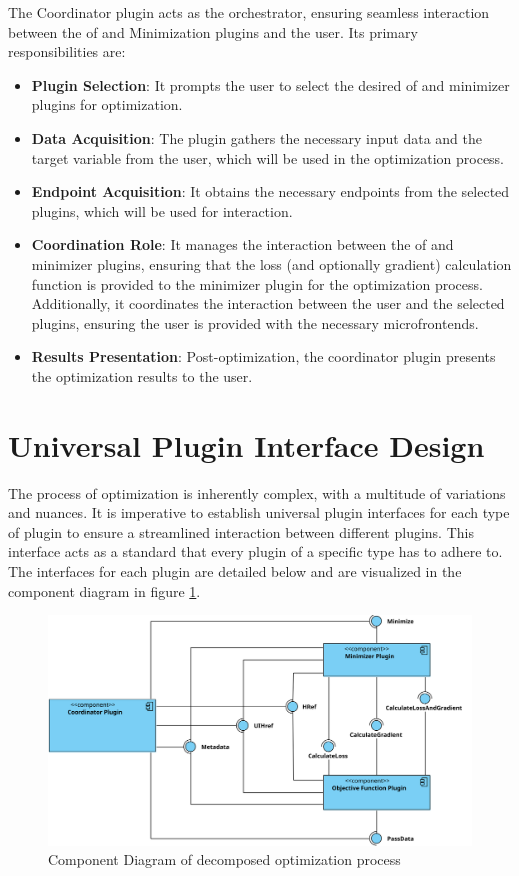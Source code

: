 \documentclass[
  a4paper,  %
  twoside,  %
  bibliography=totoc,
  headsepline,
  cleardoublepage=empty,
  parskip=half,
  draft=false
]{scrbook}
\begin{document}
The Coordinator plugin acts as the orchestrator, ensuring seamless interaction between the \gls{of} and Minimization plugins and the user.
Its primary responsibilities are:

\begin{itemize}
\item \textbf{Plugin Selection}: It prompts the user to select the desired \gls{of} and minimizer plugins for optimization.
\item \textbf{Data Acquisition}: The plugin gathers the necessary input data and the target variable from the user, which will be used in the optimization process.
\item \textbf{Endpoint Acquisition}: It obtains the necessary endpoints from the selected plugins, which will be used for interaction.
\item \textbf{Coordination Role}: It manages the interaction between the \gls{of} and minimizer plugins, ensuring that the loss (and optionally gradient) calculation function is provided to the minimizer plugin for the optimization process.
Additionally, it coordinates the interaction between the user and the selected plugins, ensuring the user is provided with the necessary microfrontends.
\item \textbf{Results Presentation}: Post-optimization, the coordinator plugin presents the optimization results to the user.
\end{itemize}


\section{Universal Plugin Interface Design}

The process of optimization is inherently complex, with a multitude of variations and nuances.
It is imperative to establish universal plugin interfaces for each type of plugin to ensure a streamlined interaction between different plugins.
This interface acts as a standard that every plugin of a specific type has to adhere to.
The interfaces for each plugin are detailed below and are visualized in the component diagram in figure \ref{fig:component_diagram}.

\begin{figure}[ht]
    \centering
    \includegraphics[width=\textwidth]{graphics/plugin_decomposition.svg}
    \caption{Component Diagram of decomposed optimization process}
    \label{fig:component_diagram}
\end{figure}
\end{document}
